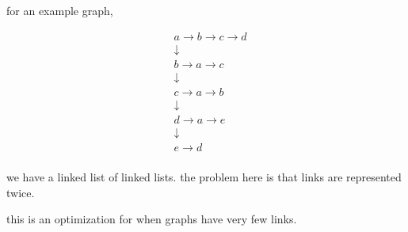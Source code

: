 \documentclass[11pt]{article}
\begin{document}
\begin{enumerate}
for an example graph,

\begin{align*}
&a \rightarrow b \rightarrow c \rightarrow d  \\
&\downarrow \\
&b \rightarrow a \rightarrow c \\
&\downarrow \\
&c \rightarrow a \rightarrow b \\
&\downarrow \\
&d \rightarrow a \rightarrow e\\
&\downarrow \\
&e \rightarrow d \\
\end{align*}

we have a linked list of linked lists. the problem here is that links are represented twice.

this is an optimization for when graphs have very few links.
\end{enumerate}
\end{document}
